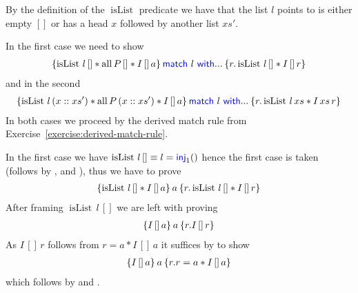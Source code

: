By the definition of the $\operatorname{isList}$ predicate we have that the list $l$ points to is either empty $[]$ or has a head $x$ followed by another list $xs'$.  

In the first case we need to show
\begin{align*}
\hoare{ \operatorname{isList} \, l\, [] \ast \operatorname{all} P \, [] \ast  I \, [] \, a}
{\langkw{match}\ l\ \langkw{with} ...}
{r.  \operatorname{isList} \, l \, [] \ast I \, []\, r} 
\end{align*}
and in the second
\begin{align*}
\hoare{ \operatorname{isList} \, l\, (x::xs') \ast \operatorname{all} P \, (x::xs') \ast  I \, [] \, a}
{\langkw{match}\ l\ \langkw{with} ...}
{r.  \operatorname{isList} \, l \, xs \ast I \, xs\, r}
\end{align*}
In both cases we proceed by the derived match rule from Exercise~\ref{exercise:derived-match-rule}.

In the first case we have $\operatorname{isList}\, l\, [] \equiv l = \textsf{\color{blue} inj}_1()$ hence the first case is taken (follows by ,  and ), thus we have to prove
\begin{align*}
\hoare{ \operatorname{isList} \, l\, [] \ast  I \, [] \, a}{a}{r.  \operatorname{isList} \, l \, [] \ast I \, []\, r} 
\end{align*}
After framing $ \operatorname{isList} \, l\, [] $ we are left with proving
\begin{align*}
\hoare{ I \, [] \, a}{a}{r. I\, [] \, r} 
\end{align*}
As $I \, [] \, r $ follows from $r = a \ast I \, [] \, a$ it suffices by  to show
\begin{align*}
\hoare{ I \, [] \, a}{a}{r.r=a \ast I \, [] \, a }
\end{align*}
which follows by  and .

